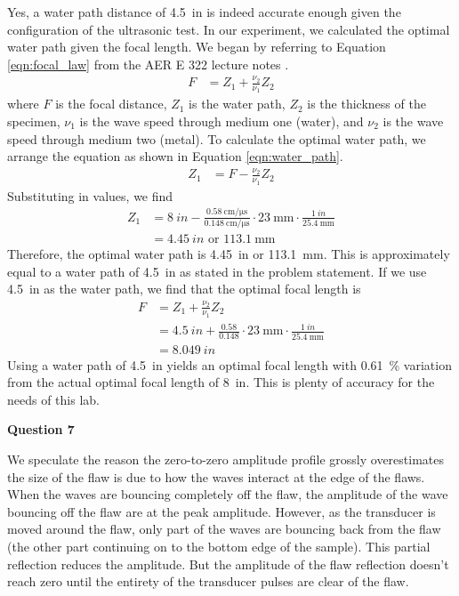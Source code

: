 \documentclass[12 pt]{report}
\begin{document}
Yes, a water path distance of \qty{4.5}{in} is indeed accurate enough given the configuration of the ultrasonic test. In our experiment, we calculated the optimal water path given the focal length. We began by referring to Equation \ref{eqn:focal_law} from the AER E \num{322} lecture notes \cite{lecture_notes}.
\begin{align}\label{eqn:focal_law}
	F&=Z_1+\frac{\nu_2}{\nu_1}Z_2
\end{align}
where $F$ is the focal distance, $Z_1$ is the water path, $Z_2$ is the thickness of the specimen, $\nu_1$ is the wave speed through medium one (water), and $\nu_2$ is the wave speed through medium two (metal). To calculate the optimal water path, we arrange the equation as shown in Equation \ref{eqn:water_path}.
\begin{align}\label{eqn:water_path}
	Z_1&=F-\frac{\nu_2}{\nu_1}Z_2
\end{align}
Substituting in values, we find
\begin{align*}
	Z_1&=\qty{8}{in}-\frac{\qty{0.58}{\cm\per\micro\second}}{\qty{0.148}{\cm\per\micro\second}}\cdot\qty{23}{\mm}\cdot\frac{\qty{1}{in}}{\qty{25.4}{\mm}}\\
	&=\qty{4.45}{in}\text{ or }\qty{113.1}{\mm}
\end{align*}
Therefore, the optimal water path is \qty{4.45}{in} or \qty{113.1}{\mm}. This is approximately equal to a water path of \qty{4.5}{in} as stated in the problem statement. If we use \qty{4.5}{in} as the water path, we find that the optimal focal length is
\begin{align*}
	F&=Z_1+\frac{\nu_2}{\nu_1}Z_2\\
	&=\qty{4.5}{in}+\frac{0.58}{0.148}\cdot\qty{23}{\mm}\cdot\frac{\qty{1}{in}}{\qty{25.4}{\mm}}\\
	&=\qty{8.049}{in}
\end{align*}
Using a water path of \qty{4.5}{in} yields an optimal focal length with \qty{0.61}{\percent} variation from the actual optimal focal length of \qty{8}{in}. This is plenty of accuracy for the needs of this lab.

\textbf{Question 7}

We speculate the reason the zero-to-zero amplitude profile grossly overestimates the size of the flaw is due to how the waves interact at the edge of the flaws. When the waves are bouncing completely off the flaw, the amplitude of the wave bouncing off the flaw are at the peak amplitude. However, as the transducer is moved around the flaw, only part of the waves are bouncing back from the flaw (the other part continuing on to the bottom edge of the sample). This partial reflection reduces the amplitude. But the amplitude of the flaw reflection doesn't reach zero until the entirety of the transducer pulses are clear of the flaw.
\end{document}
